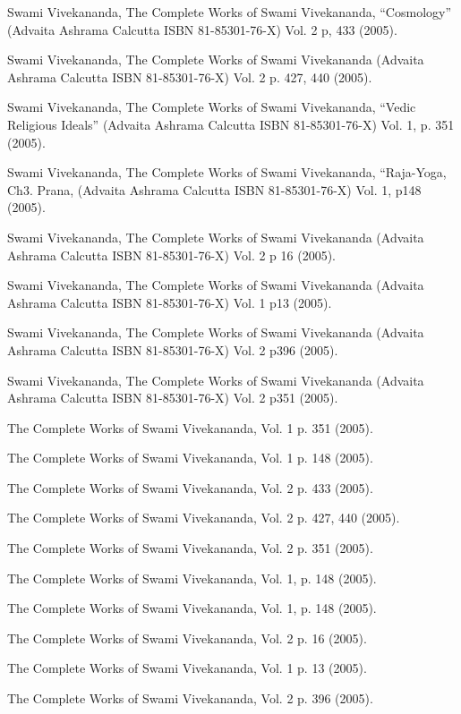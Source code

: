 \documentclass[twoside, 13pt]{article}
\begin{document}
{{{\begin{thebibliography}{99}
\bibitem{} Swami Vivekananda, The Complete Works of Swami Vivekananda, “Cosmology” (Advaita Ashrama Calcutta ISBN 81-85301-76-X) Vol. 2 p, 433 (2005).

\bibitem{} Swami Vivekananda, The Complete Works of Swami Vivekananda (Advaita Ashrama Calcutta ISBN 81-85301-76-X) Vol. 2 p. 427, 440 (2005).

\bibitem{} Swami Vivekananda, The Complete Works of Swami Vivekananda, “Vedic Religious Ideals” (Advaita Ashrama Calcutta ISBN 81-85301-76-X) Vol. 1, p. 351 (2005).

\bibitem{} Swami Vivekananda, The Complete Works of Swami Vivekananda, “Raja-Yoga, Ch3. Prana, (Advaita Ashrama Calcutta ISBN 81-85301-76-X) Vol. 1, p148 (2005).

\bibitem{} Swami Vivekananda, The Complete Works of Swami Vivekananda (Advaita Ashrama Calcutta ISBN 81-85301-76-X) Vol. 2 p 16 (2005).

\bibitem{} Swami Vivekananda, The Complete Works of Swami Vivekananda (Advaita Ashrama Calcutta ISBN 81-85301-76-X) Vol. 1 p13 (2005).

\bibitem{} Swami Vivekananda, The Complete Works of Swami Vivekananda (Advaita Ashrama Calcutta ISBN 81-85301-76-X) Vol. 2 p396 (2005).

\bibitem{} Swami Vivekananda, The Complete Works of Swami Vivekananda (Advaita Ashrama Calcutta ISBN 81-85301-76-X) Vol. 2 p351 (2005).

\bibitem{} The Complete Works of Swami Vivekananda, Vol. 1 p. 351 (2005).

\bibitem{} The Complete Works of Swami Vivekananda, Vol. 1 p. 148 (2005).

\bibitem{} The Complete Works of Swami Vivekananda, Vol. 2 p. 433 (2005).

\bibitem{} The Complete Works of Swami Vivekananda, Vol. 2 p. 427, 440 (2005).

\bibitem{} The Complete Works of Swami Vivekananda, Vol. 2 p. 351 (2005).

\bibitem{} The Complete Works of Swami Vivekananda, Vol. 1, p. 148 (2005).

\bibitem{} The Complete Works of Swami Vivekananda, Vol. 1, p. 148 (2005).

\bibitem{} The Complete Works of Swami Vivekananda, Vol. 2 p. 16 (2005).

\bibitem{} The Complete Works of Swami Vivekananda, Vol. 1 p. 13 (2005).

\bibitem{} The Complete Works of Swami Vivekananda, Vol. 2 p. 396 (2005).


\end{thebibliography}}}}
\end{document}
